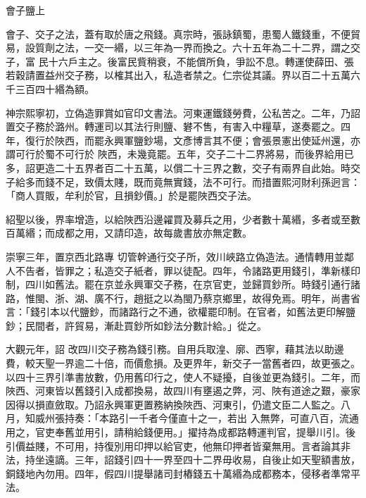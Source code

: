 
\begin{pinyinscope}

 會子鹽上



 會子、交子之法，蓋有取於唐之飛錢。真宗時，張詠鎮蜀，患蜀人鐵錢重，不便貿易，設質劑之法，一交一緡，以三年為一界而換之。六十五年為二十二界，謂之交子，富
 民十六戶主之。後富民貲稍衰，不能償所負，爭訟不息。轉運使薛田、張若穀請置益州交子務，以榷其出入，私造者禁之。仁宗從其議。界以百二十五萬六千三百四十緡為額。



 神宗熙寧初，立偽造罪賞如官印文書法。河東運鐵錢勞費，公私苦之。二年，乃詔置交子務於潞州。轉運司以其法行則鹽、礬不售，有害入中糧草，遂奏罷之。四年，復行於陜西，而罷永興軍鹽鈔場，文彥博言其不便；會張景憲出使延州還，亦謂可行於蜀不可行於
 陜西，未幾竟罷。五年，交子二十二界將易，而後界給用已多，詔更造二十五界者百二十五萬，以償二十三界之數，交子有兩界自此始。時交子給多而錢不足，致價太賤，既而竟無實錢，法不可行。而措置熙河財利孫迥言：「商人買販，牟利於官，且損鈔價。」於是罷陜西交子法。



 紹聖以後，界率增造，以給陜西沿邊糴買及募兵之用，少者數十萬緡，多者或至數百萬緡；而成都之用，又請印造，故每歲書放亦無定數。



 崇寧三年，置京西北路專
 切管幹通行交子所，效川峽路立偽造法。通情轉用並鄰人不告者，皆罪之；私造交子紙者，罪以徒配。四年，令諸路更用錢引，準新樣印制，四川如舊法。罷在京並永興軍交子務，在京官吏，並歸買鈔所。時錢引通行諸路，惟閩、浙、湖、廣不行，趙挺之以為閩乃蔡京鄉里，故得免焉。明年，尚書省言：「錢引本以代鹽鈔，而諸路行之不通，欲權罷印制。在官者，如舊法更印解鹽鈔；民間者，許貿易，漸赴買鈔所如鈔法分數計給。」從之。



 大觀元年，詔
 改四川交子務為錢引務。自用兵取湟、廓、西寧，藉其法以助邊費，較天聖一界逾二十倍，而價愈損。及更界年，新交子一當舊者四，故更張之。以四十三界引準書放數，仍用舊印行之，使人不疑擾，自後並更為錢引。二年，而陜西、河東皆以舊錢引入成都換易，故四川有壅遏之弊，河、陜有道途之艱，豪家因得以損直斂取。乃詔永興軍更置務納換陜西、河東引，仍遣文臣二人監之。八月，知威州張持奏：「本路引一千者今僅直十之一，若出
 入無弊，可直八百，流通用之，官吏奉舊並用引，請稍給錢便用。」擢持為成都路轉運判官，提舉川引。後引價益賤，不可用，持復別用印押以給官吏，他無印押者皆棄無用。言者論其非法，持坐遠謫。三年，詔錢引四十一界至四十二界毋收易，自後止如天聖額書放，銅錢地內勿用。四年，假四川提舉諸司封樁錢五十萬緡為成都務本，侵移者準常平法。




\end{pinyinscope}
